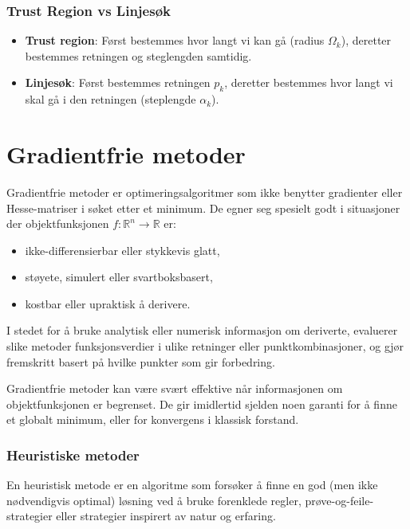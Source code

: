 \subsection{Trust Region vs Linjesøk}

\begin{itemize}
	\item \textbf{Trust region}: Først bestemmes hvor langt vi kan gå (radius \( \Omega_k \)), deretter bestemmes retningen og steglengden samtidig.
	\item \textbf{Linjesøk}: Først bestemmes retningen \( p_k \), deretter bestemmes hvor langt vi skal gå i den retningen (steplengde \( \alpha_k \)).
\end{itemize}

\chapter{Gradientfrie metoder}
\label{sec:gradientfrie_metoder}

Gradientfrie metoder er optimeringsalgoritmer som ikke benytter gradienter eller Hesse-matriser i søket etter et minimum.
De egner seg spesielt godt i situasjoner der objektfunksjonen \( f : \mathbb{R}^n \to \mathbb{R} \) er:
\begin{itemize}
	\item ikke-differensierbar eller stykkevis glatt,
	\item støyete, simulert eller svartboksbasert,
	\item kostbar eller upraktisk å derivere.
\end{itemize}

I stedet for å bruke analytisk eller numerisk informasjon om deriverte, evaluerer slike metoder funksjonsverdier i ulike retninger eller punktkombinasjoner, og gjør fremskritt basert på hvilke punkter som gir forbedring.

Gradientfrie metoder kan være svært effektive når informasjonen om objektfunksjonen er begrenset. De gir imidlertid sjelden noen garanti for å finne et globalt minimum, eller for konvergens i klassisk forstand.

\subsection{Heuristiske metoder}

En heuristisk metode er en algoritme som forsøker å finne en god (men ikke nødvendigvis optimal) løsning ved å bruke forenklede regler, prøve-og-feile-strategier eller strategier inspirert av natur og erfaring.

